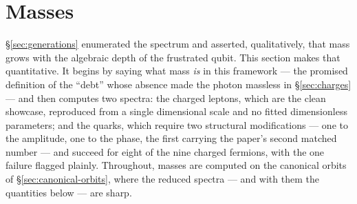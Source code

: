 
\section{Masses}
\label{sec:masses}

\S\ref{sec:generations} enumerated the spectrum and asserted, qualitatively, that mass grows
with the algebraic depth of the frustrated qubit. This section makes that quantitative. It
begins by saying what mass \emph{is} in this framework --- the promised definition of the
``debt'' whose absence made the photon massless in \S\ref{sec:charges} --- and then computes two
spectra: the charged leptons, which are the clean showcase, reproduced from a single dimensional
scale and no fitted dimensionless parameters; and the quarks, which require two structural
modifications --- one to the amplitude, one to the phase, the first carrying the paper's second
matched number --- and succeed for eight of the nine charged fermions, with the one failure
flagged plainly. Throughout, masses are computed on the canonical orbits of
\S\ref{sec:canonical-orbits}, where the reduced spectra --- and with them the quantities below
--- are sharp.

